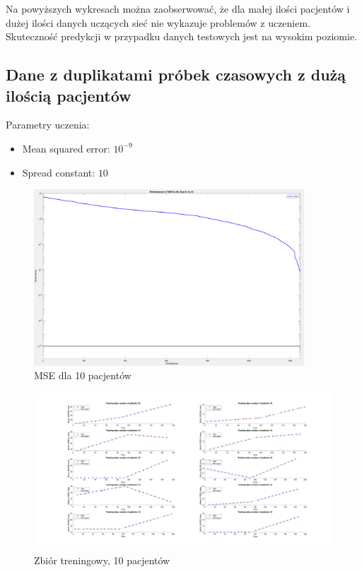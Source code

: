 \documentclass[12pt]{article}
\begin{document}
\newpage

Na powyższych wykresach można zaobserwować, że dla małej ilości pacjentów i dużej ilości danych uczących sieć nie wykazuje problemów z uczeniem. Skuteczność predykcji w przypadku danych testowych jest na wysokim poziomie.

\subsection{Dane z duplikatami próbek czasowych z dużą ilością pacjentów}

Parametry uczenia:
\begin{itemize}
\item Mean squared error: $10^{-9}$
\item Spread constant: $10$
\end{itemize}

\begin{figure}[h!]

\centering
\includegraphics[width=0.9\textwidth]{mse-normal-10.png}
\caption{MSE dla 10 pacjentów}

\end{figure}

\begin{figure}[h!]

\centering
\includegraphics[width=1.1\textwidth]{training-normal-10.png}
\caption{Zbiór treningowy, 10 pacjentów}

\end{figure}
\end{document}
